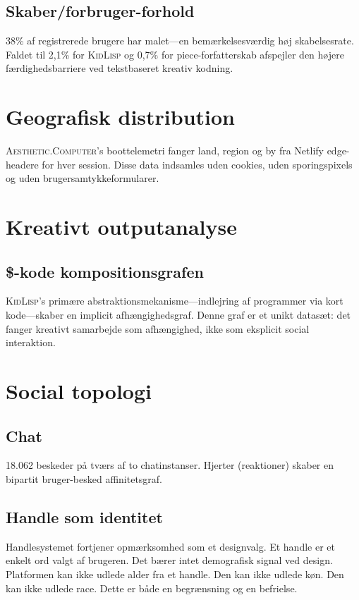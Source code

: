 \documentclass[10pt,letterpaper,twocolumn]{article}
\newcommand{\ac}{\textsc{Aesthetic.Computer}}
\newcommand{\kl}{\textsc{KidLisp}}
\begin{document}
\subsection{Skaber/forbruger-forhold}

38\% af registrerede brugere har malet---en bemærkelsesværdig høj skabelsesrate. Faldet til 2,1\% for \kl{} og 0,7\% for piece-forfatterskab afspejler den højere færdighedsbarriere ved tekstbaseret kreativ kodning.

\section{Geografisk distribution}

\ac{}'s boottelemetri fanger land, region og by fra Netlify edge-headere for hver session. Disse data indsamles uden cookies, uden sporingspixels og uden brugersamtykkeformularer.

\section{Kreativt outputanalyse}

\subsection{\$-kode kompositionsgrafen}

\kl{}'s primære abstraktionsmekanisme---indlejring af programmer via kort kode---skaber en implicit afhængighedsgraf. Denne graf er et unikt datasæt: det fanger kreativt samarbejde som afhængighed, ikke som eksplicit social interaktion.

\section{Social topologi}

\subsection{Chat}

18.062 beskeder på tværs af to chatinstanser. Hjerter (reaktioner) skaber en bipartit bruger-besked affinitetsgraf.

\subsection{Handle som identitet}

Handlesystemet fortjener opmærksomhed som et designvalg. Et handle er et enkelt ord valgt af brugeren. Det bærer intet demografisk signal ved design. Platformen kan ikke udlede alder fra et handle. Den kan ikke udlede køn. Den kan ikke udlede race. Dette er både en begrænsning og en befrielse.
\end{document}
